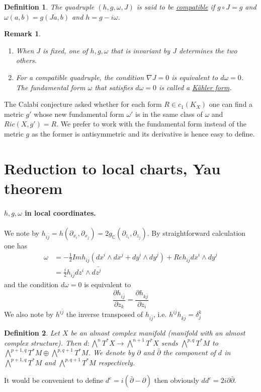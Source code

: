 \documentclass[11pt]{article}
\newtheorem{remark}{Remark}
\newtheorem{definition}{Definition}
\begin{document}
\begin{definition}
The quadruple \((h, g, \omega, J)\) is said to be \uline{compatible} if \(g\circ J = g\) and \(\omega(a,b) =
g(Ja,b)\) and \(h = g - i\omega\). 
\end{definition}

\begin{remark}
\begin{enumerate}
\item When \(J\) is fixed, one of \(h,g,\omega\) that is invariant by \(J\) determines the two others.
\item For a compatible quadruple, the condition \(\nabla J = 0\) is equivalent to \(d\omega = 0\). The
fundamental form \(\omega\) that satisfies \(d\omega = 0\) is called a \uline{Kähler form}.
\end{enumerate}
\end{remark}


The Calabi conjecture asked whether for each form \(R\in c_1(K_X)\) one can find a metric \(g'\) whose
new fundamental form \(\omega'\) is in the same class of \(\omega\) and \(Ric(X,g') = R\). We prefer to
work with the fundamental form instead of the metric \(g\) as the former is antisymmetric and its
derivative is hence easy to define.

\section{Reduction to local charts, Yau theorem}
\label{sec:orgec41f20}
\paragraph{\(h,g,\omega\) in local coordinates.}
\label{sec:orga12bb61}
We note by \(h_{i\bar j} = h(\partial_{x_i},\partial_{x_j}) =
2g_{\mathbb{C}}(\partial_{z_i},\partial_{z_j})\). By straightforward calculation one has
\begin{align*}
\omega & = -\frac{1}{2} Im h_{i\bar j} (dx^i\wedge dx^j + dy^i\wedge dy^j) + Re h_{i\bar j}dx^i\wedge dy^j\\
& = \frac{i}{2}h_{i\bar j}dz^i\wedge d\bar{z^j}
\end{align*}
and the condition \(d\omega = 0\) is equivalent to
\[
\frac{\partial h_{i\bar j}}{\partial z_k} = \frac{\partial h_{k\bar j}}{\partial z_i}
\]
We also note by \(h^{i\bar j}\) the inverse transposed of \(h_{i\bar j}\), i.e. \(h^{i\bar j}h_{k\bar j}
= \delta_j^k\)
\begin{definition}
Let \(X\) be an almost complex manifold (manifold with an almost complex structure). Then
\(d:\bigwedge^nT^*X\longrightarrow \bigwedge^{n+1}T^*X\) sends \(\bigwedge^{p,q}T^*M\) to
\(\bigwedge^{p+1,q}T^*M\oplus \bigwedge^{p,q+1}T^*M\). We denote by \(\partial\) and \(\bar\partial\) the
component of \(d\) in \(\bigwedge^{p+1,q}T^*M\) and \(\bigwedge^{p,q+1}T^*M\) respectively. 
\end{definition}
It would be convenient to define \(d^c =i(\bar\partial - \partial)\) then obviously \(dd^c =
2i\partial\bar\partial\). 
\end{document}
